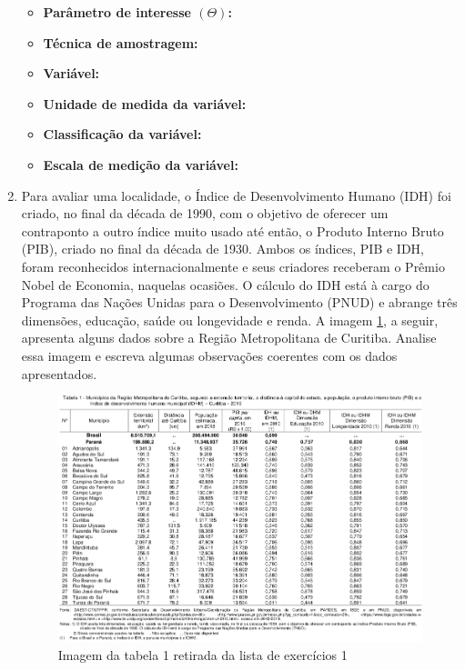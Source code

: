 \begin{enumerate}
\begin{itemize}
		\item \textbf{Parâmetro de interesse $\left(\varTheta\right)$:}~
		
		\item \textbf{Técnica de amostragem:}~
		
		\item \textbf{Variável:}~
		
		\item \textbf{Unidade de medida da variável:}~
		
		\item \textbf{Classificação da variável:}~
		
		\item \textbf{Escala de medição da variável:}~
	\end{itemize}

	\item Para avaliar uma localidade, o Índice de Desenvolvimento Humano (IDH) foi criado, no
final da década de 1990, com o objetivo de oferecer um contraponto a outro índice
muito usado até então, o Produto Interno Bruto (PIB), criado no final da década de 1930.
	Ambos os índices, PIB e IDH, foram reconhecidos internacionalmente e seus criadores
receberam o Prêmio Nobel de Economia, naquelas ocasiões. O cálculo do IDH está à
cargo do Programa das Nações Unidas para o Desenvolvimento (PNUD) e abrange
três dimensões, educação, saúde ou longevidade e renda. A imagem \ref{fig:imagem-da-tabela-1}, a seguir,
apresenta alguns dados sobre a Região Metropolitana de Curitiba. Analise essa imagem
e escreva algumas observações coerentes com os dados apresentados.

	\begin{figure}[h]
		\centering
		\includegraphics[width=\linewidth]{"fig/imagem da tabela 1"}
		\caption[Imagem da tabela 1]{Imagem da tabela 1 retirada da lista de exercícios 1}
		\label{fig:imagem-da-tabela-1}
	\end{figure}


\end{enumerate}

